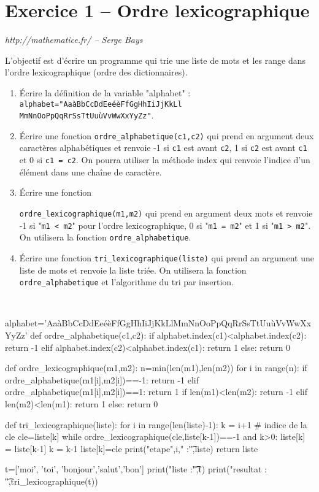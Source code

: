 \section*{Exercice 1 -- Ordre lexicographique}
\textit{http://mathematice.fr/ -- Serge Bays}

L’objectif est d’écrire un programme qui trie une liste de mots et les range dans l’ordre lexicographique (ordre des dictionnaires).
\begin{enumerate}
\item Écrire la définition de la variable "alphabet" :
\texttt{alphabet="AaàBbCcDdEeéèFfGgHhIiJjKkLl} \texttt{MmNnOoPpQqRrSsTtUuùVvWwXxYyZz"}.
\item Écrire une fonction \texttt{ordre\_alphabetique(c1,c2)} qui prend en argument deux caractères alphabétiques et renvoie -1 si \texttt{c1} est avant \texttt{c2}, 1 si \texttt{c2} est avant \texttt{c1} et 0 si \texttt{c1 = c2}. On pourra utiliser la
méthode index qui renvoie l’indice d’un élément dans une chaîne de caractère.
\item Écrire une fonction 

\texttt{ordre\_lexicographique(m1,m2)} qui prend en argument deux mots et renvoie -1 si "\texttt{m1 < m2}" pour l’ordre lexicographique, 0 si "\texttt{m1 = m2}" et 1 si "\texttt{m1 > m2}". On utilisera la
fonction \texttt{ordre\_alphabetique}.
\item Écrire une fonction \texttt{tri\_lexicographique(liste)} qui prend an argument une liste de mots et renvoie la liste triée. On utilisera la fonction \texttt{ordre\_alphabetique} et l’algorithme du tri par insertion.
\end{enumerate}

\ifprof
\begin{corrige}~\\

\begin{python}
alphabet='AaàBbCcDdEeéèFfGgHhIiJjKkLlMmNnOoPpQqRrSsTtUuùVvWwXxYyZz'
def ordre_alphabetique(c1,c2):
    if alphabet.index(c1)<alphabet.index(c2):
        return -1
    elif alphabet.index(c2)<alphabet.index(c1):
        return 1
    else:
        return 0

def ordre_lexicographique(m1,m2):
    n=min(len(m1),len(m2))
    for i in range(n):
        if ordre_alphabetique(m1[i],m2[i])==-1:
            return -1
        elif ordre_alphabetique(m1[i],m2[i])==1:
            return 1
    if len(m1)<len(m2):
        return -1
    elif len(m2)<len(m1):
        return 1
    else:
        return 0

def tri_lexicographique(liste):
    for i in range(len(liste)-1):
        k = i+1 # indice de la cle
        cle=liste[k]
        while ordre_lexicographique(cle,liste[k-1])==-1 and k>0:
            liste[k] = liste[k-1]
            k = k-1
        liste[k]=cle
        print("etape",i," :\t",liste)
    return liste

t=['moi', 'toi', 'bonjour','salut','bon']
print("liste :\t\t",t)
print("resultat : \t",tri_lexicographique(t))
\end{python}
\end{corrige}
\else
\fi


